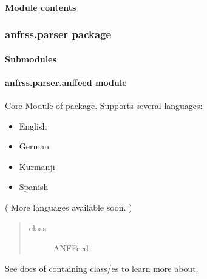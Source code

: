 \documentclass[letterpaper,10pt,english]{sphinxmanual}
\begin{document}
\paragraph{Module contents}
\label{\detokenize{anfrss.gui:module-anfrss.gui}}\label{\detokenize{anfrss.gui:module-contents}}

\subsubsection{anfrss.parser package}
\label{\detokenize{anfrss.parser:anfrss-parser-package}}\label{\detokenize{anfrss.parser::doc}}

\paragraph{Submodules}
\label{\detokenize{anfrss.parser:submodules}}

\paragraph{anfrss.parser.anffeed module}
\label{\detokenize{anfrss.parser:anfrss-parser-anffeed-module}}
Core Module of package.
Supports several languages:
\begin{itemize}
\item {} 
English

\item {} 
German

\item {} 
Kurmanji

\item {} 
Spanish

\end{itemize}

( More languages available soon. )
\begin{quote}\begin{description}
\item[{class}] \leavevmode
ANFFeed

\end{description}\end{quote}

See docs of containing class/es
to learn more about.
\end{document}
